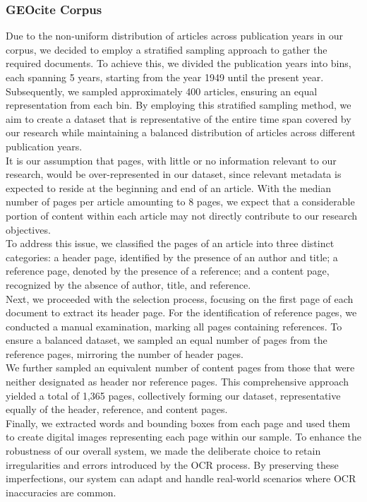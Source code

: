 \subsubsection{GEOcite Corpus}
Due to the non-uniform distribution of articles across publication years in our corpus, we decided to employ a stratified sampling approach to gather the required documents. To achieve this, we divided the publication years into bins, each spanning 5 years, starting from the year 1949 until the present year. Subsequently, we sampled approximately 400 articles, ensuring an equal representation from each bin. By employing this stratified sampling method, we aim to create a dataset that is representative of the entire time span covered by our research while maintaining a balanced distribution of articles across different publication years.\\
It is our assumption that pages, with little or no information relevant to our research, would be over-represented in our dataset, since relevant metadata is expected to reside at the beginning and end of an article. With the median number of pages per article amounting to 8 pages, we expect that a considerable portion of content within each article may not directly contribute to our research objectives.\\
To address this issue, we classified the pages of an article into three distinct categories: a header page, identified by the presence of an author and title; a reference page, denoted by the presence of a reference; and a content page, recognized by the absence of author, title, and reference.\\
Next, we proceeded with the selection process, focusing on the first page of each document to extract its header page. For the identification of reference pages, we conducted a manual examination, marking all pages containing references. To ensure a balanced dataset, we sampled an equal number of pages from the reference pages, mirroring the number of header pages.\\
We further sampled an equivalent number of content pages from those that were neither designated as header nor reference pages. This comprehensive approach yielded a total of 1,365 pages, collectively forming our dataset, representative equally of the header, reference, and content pages.\\
Finally, we extracted words and bounding boxes from each page and used them to create digital images representing each page within our sample. To enhance the robustness of our overall system, we made the deliberate choice to retain irregularities and errors introduced by the OCR process. By preserving these imperfections, our system can adapt and handle real-world scenarios where OCR inaccuracies are common.\\

